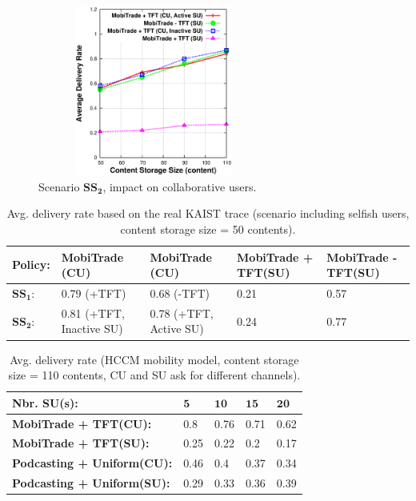 \begin{figure}[!h]
  \begin{center}
    \includegraphics[width=3in,height=2.2in]{Chapitre5/fig6.eps}
  \end{center}
  \caption{Scenario $\mathbf{SS_2}$, impact on collaborative users.}
  \label{MN+ECH+ICN}
\end{figure}

\begin{table}[!h]
\caption{Avg. delivery rate based on the real KAIST trace (scenario including selfish users, content storage size = 50 contents).}
\centering
\label{table:kaist:mal}
\footnotesize
\begin{tabular}{|p{1.5cm}|p{2.5cm}|p{2.5cm}|p{2.5cm}|p{2.5cm}|}
\hline
\bfseries Policy:& \bfseries MobiTrade (CU) & \bfseries MobiTrade (CU)& \bfseries MobiTrade + TFT(SU) & \bfseries MobiTrade - TFT(SU)\\
\hline
$\mathbf{SS_{1}}$: & 0.79 (+TFT)& 0.68 (-TFT) & 0.21& 0.57 \\
\hline
$\mathbf{SS_{2}}$: & 0.81 (+TFT, Inactive SU) & 0.78 (+TFT, Active SU) &0.24&0.77\\
\hline
\end{tabular}
\end{table}

\begin{table}[!h]
\caption{Avg. delivery rate (HCCM mobility model, content storage size = 110 contents, CU and SU ask for different channels).}
\centering
\label{table:hcmm:vss}
\footnotesize
\begin{tabular}{|p{5cm}|p{0.8cm}|p{0.8cm}|p{0.8cm}|p{0.8cm}|}
\hline
\bfseries Nbr. SU(s):& $\mathbf{5}$ & $\mathbf{10}$& $\mathbf{15}$ & $\mathbf{20}$\\
\hline
\bfseries MobiTrade + TFT(CU): & 0.8 & 0.76 &0.71 &0.62 \\
\hline
\bfseries MobiTrade + TFT(SU): & 0.25 & 0.22 &0.2&0.17\\
\hline
\bfseries Podcasting + Uniform(CU): &  0.46&0.4 &0.37&0.34\\
\hline
\bfseries Podcasting + Uniform(SU): & 0.29&0.33&0.36&0.39\\
\hline
\end{tabular}
\end{table}

